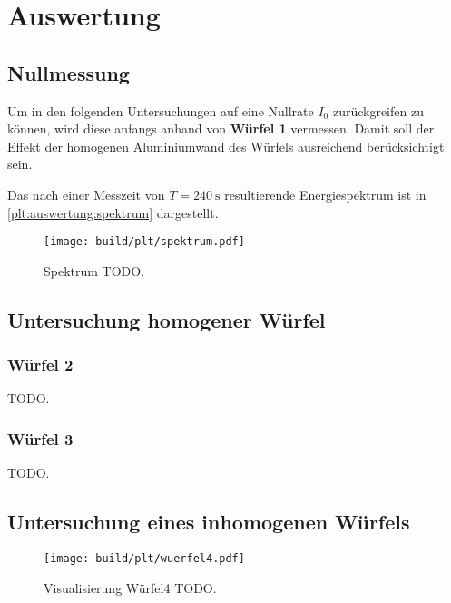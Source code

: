 \section{Auswertung}
\label{sec:auswertung}

\subsection{Nullmessung}
Um in den folgenden Untersuchungen auf eine Nullrate $I_0$ zurückgreifen zu können,
wird diese anfangs anhand von \textbf{Würfel 1} vermessen.
Damit soll der Effekt der homogenen Aluminiumwand des Würfels ausreichend berücksichtigt sein.

Das nach einer Messzeit von $T = \SI{240}{\second}$ resultierende Energiespektrum ist in \autoref{plt:auswertung:spektrum} dargestellt.


\begin{figure}
    \centering
    \texttt{[image: build/plt/spektrum.pdf]}
    \caption{Spektrum TODO.}
    \label{plt:auswertung:spektrum}
\end{figure}


\subsection{Untersuchung homogener Würfel}
\subsubsection{\textbf{Würfel 2}}
\begin{table}[H]
    \centering
    \caption{TODO.}
    \label{tab:auswertung:wuerfel2}
\end{table}

\subsubsection{\textbf{Würfel 3}}
\begin{table}[H]
    \centering
    \caption{TODO.}
    \label{tab:auswertung:wuerfel3}
\end{table}


\subsection{Untersuchung eines inhomogenen Würfels}

\begin{figure}
    \centering
    \texttt{[image: build/plt/wuerfel4.pdf]}
    \caption{Visualisierung Würfel4 TODO.}
    \label{plt:auswertung:wuerfel4}
\end{figure}
